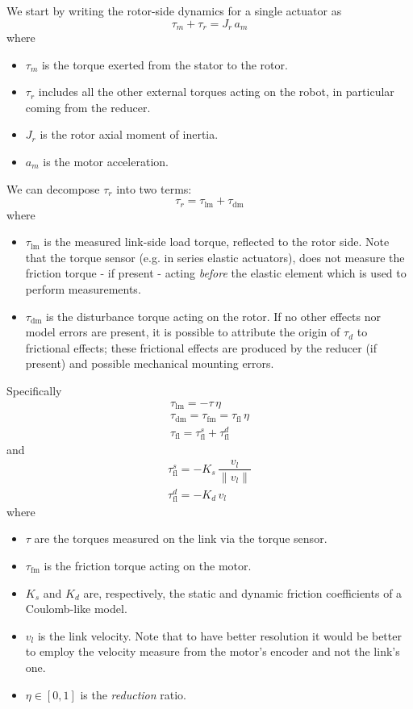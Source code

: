 \documentclass[letterpaper, 10 pt, conference]{ieeeconf}  %
\begin{document}
We start by writing the rotor-side dynamics for a single actuator as
\begin{equation}
\tau_m + \tau_r = J_r\,a_m
\end{equation}
where 
\begin{itemize}
	\item $\tau_m$ is the torque exerted from the stator to the rotor.
	\item $\tau_r$ includes all the other external torques acting on the robot, in particular coming from the reducer.
	\item $J_r$ is the rotor axial moment of inertia.
	\item $a_m$ is the motor acceleration.
\end{itemize}
We can decompose $\tau_r$ into two terms:
\begin{equation}
\tau_r = \tau_{\mathrm{lm}} + \tau_{\mathrm{dm}}
\end{equation}
where 
\begin{itemize}
	\item $\tau_{\mathrm{lm}}$ is the measured link-side load torque, reflected to the rotor side. Note that the torque sensor (e.g. in series elastic actuators), does not measure the friction torque - if present - acting \textit{before} the elastic element which is used to perform measurements.
	\item $\tau_{\mathrm{dm}}$ is the disturbance torque acting on the rotor. If no other effects nor model errors are present, it is possible to attribute the origin of $\tau_d$ to frictional effects; these frictional effects are produced by the reducer (if present) and possible mechanical mounting errors.
\end{itemize}
Specifically
\begin{eqnarray}
\tau_{\mathrm{lm}} = - \tau\,\eta\\ 
\tau_{\mathrm{dm}} = \tau_{\mathrm{fm}} = \tau_{\mathrm{fl}} \, \eta \\
\tau_{\mathrm{fl}} = \tau_{\mathrm{fl}}^{s} + \tau_{\mathrm{fl}}^{d}
\end{eqnarray}
and 
\begin{eqnarray}
\tau_{\mathrm{fl}}^{s} = - K_{s}\,\dfrac{v_l}{\lVert v_l\rVert}\\
\tau_{\mathrm{fl}}^{d} = - K_{d}\,v_l
\end{eqnarray}
where
\begin{itemize}
	\item $\tau$ are the torques measured on the link via the torque sensor.
	\item $\tau_{\mathrm{fm}}$ is the friction torque acting on the motor.
	\item $K_{s}$ and $K_{d}$ are, respectively, the static and dynamic friction coefficients of a Coulomb-like model.
	\item $v_l$ is the link velocity. Note that to have better resolution it would be better to employ the velocity measure from the motor's encoder and not the link's one.
	\item $\eta\in \left[0, 1\right]$ is the \textit{reduction} ratio.
\end{itemize}
\end{document}
